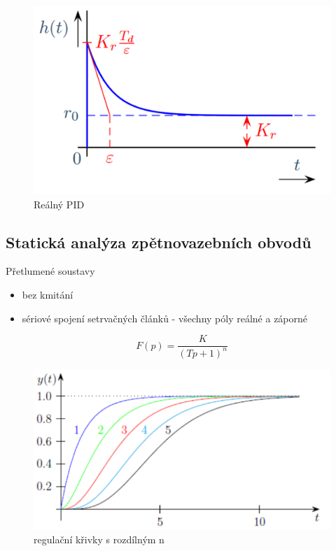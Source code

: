 \begin{figure}[H]
    \includegraphics[scale = 0.3]{images/PID.png}
    \caption{Reálný PID}
    \label{PID}
\end{figure}
\subsection*{Statická analýza zpětnovazebních obvodů}
Přetlumené soustavy
\begin{itemize}
    \item bez kmitání
    \item sériové spojení setrvačných článků - všechny póly reálné a záporné
\end{itemize}
\begin{equation}
    F(p) =\frac{K}{(Tp+1)^n}
\end{equation}
\begin{figure}[H]
    \includegraphics[scale = 1]{images/tlumeni.png}
    \caption{regulační křivky s rozdílným n}
\end{figure}

